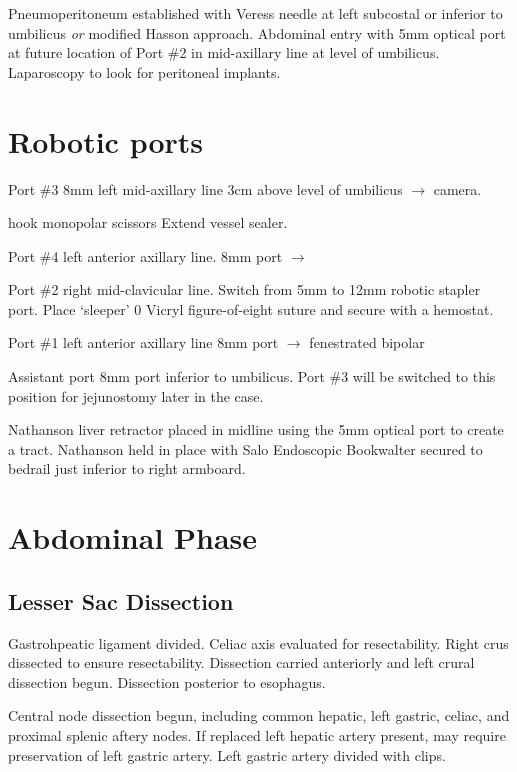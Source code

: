 \documentclass[
  letterpaper,
]{scrbook}
\begin{document}
Pneumoperitoneum established with Veress needle at left subcostal or
inferior to umbilicus \emph{or} modified Hasson approach. Abdominal
entry with 5mm optical port at future location of Port \#2 in
mid-axillary line at level of umbilicus. Laparoscopy to look for
peritoneal implants.

\section{Robotic ports}\label{robotic-ports}

Port \#3 8mm left mid-axillary line 3cm above level of umbilicus
\(\rightarrow\) camera.

hook \textbar{} monopolar scissors \textbar{} Extend vessel sealer.

Port \#4 left anterior axillary line. 8mm port \(\rightarrow\)

Port \#2 right mid-clavicular line. Switch from 5mm to 12mm robotic
stapler port. Place `sleeper' 0 Vicryl figure-of-eight suture and secure
with a hemostat.

Port \#1 left anterior axillary line 8mm port \(\rightarrow\)
fenestrated bipolar

Assistant port 8mm port inferior to umbilicus. Port \#3 will be switched
to this position for jejunostomy later in the case.

Nathanson liver retractor placed in midline using the 5mm optical port
to create a tract. Nathanson held in place with Salo Endoscopic
Bookwalter secured to bedrail just inferior to right armboard.

\section{Abdominal Phase}\label{abdominal-phase}

\subsection{Lesser Sac Dissection}\label{lesser-sac-dissection}

Gastrohpeatic ligament divided. Celiac axis evaluated for resectability.
Right crus dissected to ensure resectability. Dissection carried
anteriorly and left crural dissection begun. Dissection posterior to
esophagus.

Central node dissection begun, including common hepatic, left gastric,
celiac, and proximal splenic aftery nodes. If replaced left hepatic
artery present, may require preservation of left gastric artery. Left
gastric artery divided with clips.
\end{document}
